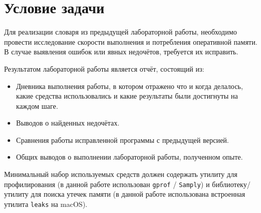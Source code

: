 \section{Условие задачи}
Для реализации словаря из предыдущей лабораторной работы, необходимо провести исследование скорости выполнения и потребления оперативной памяти. В случае выявления ошибок или явных недочётов, требуется их исправить.

Результатом лабораторной работы является отчёт, состоящий из:
\begin{itemize}
    \item Дневника выполнения работы, в котором отражено что и когда делалось, какие средства использовались и какие результаты были достигнуты на каждом шаге.
    \item Выводов о найденных недочётах.
    \item Сравнения работы исправленной программы с предыдущей версией.
    \item Общих выводов о выполнении лабораторной работы, полученном опыте.
\end{itemize}

Минимальный набор используемых средств должен содержать утилиту для профилирования (в данной работе использован \texttt{gprof} / \texttt{Samply}) и библиотеку/утилиту для поиска утечек памяти (в данной работе использована встроенная утилита \texttt{leaks} на macOS).
\newpage